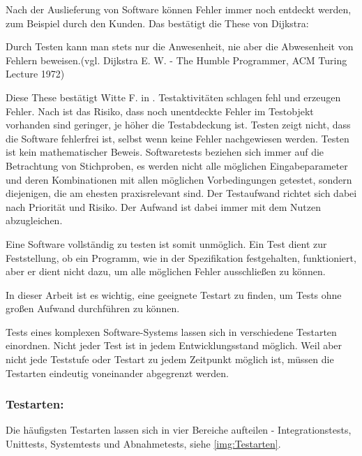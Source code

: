 \documentclass[a4paper,titlepage,halfparskip,12pt]{scrreprt}
\begin{document}
\begin{onehalfspacing}
Nach der Auslieferung von Software können Fehler immer noch entdeckt werden, zum Beispiel durch den Kunden. Das bestätigt die These von Dijkstra:

\smallskip

\glqq Durch Testen kann man stets nur die Anwesenheit, nie aber die Abwesenheit von Fehlern beweisen.\grqq (vgl. Dijkstra E. W. - The Humble Programmer, ACM Turing Lecture 1972)

\smallskip

Diese These bestätigt Witte F. in \cite{witte2019testmanagement}. Testaktivitäten schlagen fehl und erzeugen Fehler. Nach \cite{witte2019testmanagement} ist das Risiko, dass noch unentdeckte Fehler im Testobjekt vorhanden sind geringer, je höher die Testabdeckung ist. Testen zeigt nicht, dass die Software fehlerfrei ist, selbst wenn keine Fehler nachgewiesen werden. Testen ist kein mathematischer Beweis. Softwaretests beziehen sich immer auf die Betrachtung von Stichproben, es werden nicht alle möglichen Eingabeparameter und deren Kombinationen mit allen möglichen Vorbedingungen getestet, sondern diejenigen, die am ehesten praxisrelevant sind. Der Testaufwand richtet sich dabei nach Priorität und Risiko. Der Aufwand ist dabei immer mit
dem Nutzen abzugleichen.

Eine Software vollständig zu testen ist somit unmöglich. Ein Test dient zur Feststellung, ob ein Programm, wie in der Spezifikation festgehalten,
funktioniert, aber er dient nicht dazu, um alle möglichen Fehler ausschließen zu können.

In dieser Arbeit ist es wichtig, eine geeignete Testart zu finden, um Tests ohne großen Aufwand durchführen zu können.

Tests eines komplexen Software-Systems lassen sich in verschiedene Testarten einordnen. Nicht jeder Test ist in jedem Entwicklungsstand möglich. Weil aber nicht jede Teststufe oder Testart zu jedem Zeitpunkt möglich ist, müssen die Testarten eindeutig voneinander abgegrenzt werden.

\subsubsection*{Testarten:}

Die häufigsten Testarten lassen sich in vier Bereiche aufteilen - Integrationstests, Unittests, Systemtests und Abnahmetests, siehe \autoref{img:Testarten}.


\end{onehalfspacing}
\end{document}
